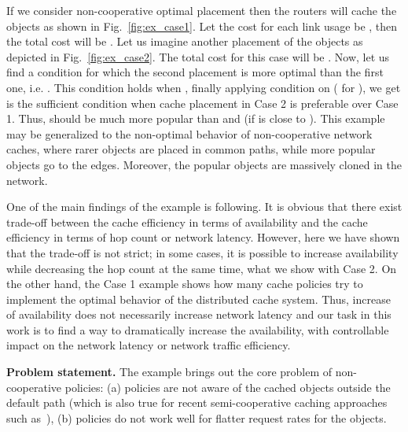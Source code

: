\documentclass[article]{elsarticle}
\begin{document}
If we consider non-cooperative optimal placement then the routers will cache the objects as shown in Fig.~\ref{fig:ex_case1}. Let the cost for each link usage be , then the total cost will be . Let us imagine another placement of the objects as depicted in Fig.~\ref{fig:ex_case2}. The total cost for this case will be . Now, let us find a condition for which the second placement is more optimal than the first one, i.e. . This condition holds when , finally applying condition on  ( for ),  we get  is the sufficient condition when cache placement in Case 2 is preferable over Case 1. Thus,  should be much more popular than  and  (if  is close to ). This example may be generalized to the non-optimal behavior of non-cooperative network caches, where rarer objects are placed in common paths, while more popular objects go to the edges. Moreover, the popular objects are massively cloned in the network.

One of the main findings of the example is following. It is obvious that there exist trade-off between the cache efficiency in terms of availability and the cache efficiency in terms of hop count or network latency. However, here we have shown that the trade-off is not strict; in some cases, it is possible to increase availability while decreasing the hop count at the same time, what we show with Case 2. On the other hand, the Case 1 example shows how many cache policies try to implement the optimal behavior of the distributed cache system. Thus, increase of availability does not necessarily increase network latency and our task in this work is to find a way to dramatically increase the availability, with controllable impact on the network latency or network traffic efficiency. 

\textbf{Problem statement.} The example brings out the core problem of non-cooperative policies: (a) policies are not aware of the cached objects outside the default path (which is also true for recent semi-cooperative caching approaches such as~\cite{psarasprobabilistic, chai2012cacheless}), (b) policies do not work well for flatter request rates for the objects. 
\end{document}
